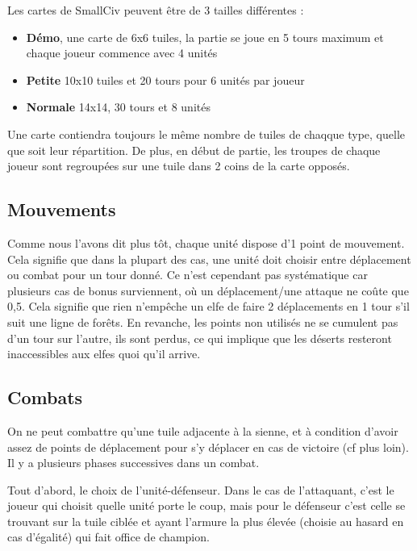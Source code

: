 Les cartes de SmallCiv peuvent être de 3 tailles différentes :\newline
\begin{itemize}\renewcommand{\labelitemi}{$\bullet$}
\item \textbf{Démo}, une carte de 6x6 tuiles, la partie se joue en 5 tours maximum et chaque joueur commence avec 4 unités
\item \textbf{Petite}  10x10 tuiles et 20 tours pour 6 unités par joueur
\item \textbf{Normale} 14x14, 30 tours et 8 unités
\end{itemize}
Une carte contiendra toujours le même nombre de tuiles de chaqque type, quelle que soit leur répartition. De plus, en début de partie, les troupes de chaque joueur sont regroupées sur une tuile dans 2 coins de la carte opposés. 

\subsection{Mouvements}
Comme nous l'avons dit plus tôt, chaque unité dispose d'1 point de mouvement. Cela signifie que dans la plupart des cas, une unité doit choisir entre déplacement ou combat pour un tour donné. Ce n'est cependant pas systématique car plusieurs cas de bonus surviennent, où un déplacement/une attaque ne coûte que 0,5. Cela signifie que rien n'empêche un elfe de faire 2 déplacements en 1 tour s'il suit une ligne de forêts.\newline
En revanche, les points non utilisés ne se cumulent pas d'un tour sur l'autre, ils sont perdus, ce qui implique que les déserts resteront inaccessibles aux elfes quoi qu'il arrive. 

\subsection{Combats}
On ne peut combattre qu'une tuile adjacente à la sienne, et à condition d'avoir assez de points de déplacement pour s'y déplacer en cas de victoire (cf plus loin). Il y a plusieurs phases successives dans un combat. \newline

Tout d'abord, le choix de l'unité-défenseur. Dans le cas de l'attaquant, c'est le joueur qui choisit quelle unité porte le coup, mais pour le défenseur c'est celle se trouvant sur la tuile ciblée et ayant l'armure la plus élevée (choisie au hasard en cas d'égalité) qui fait office de champion. \newline


